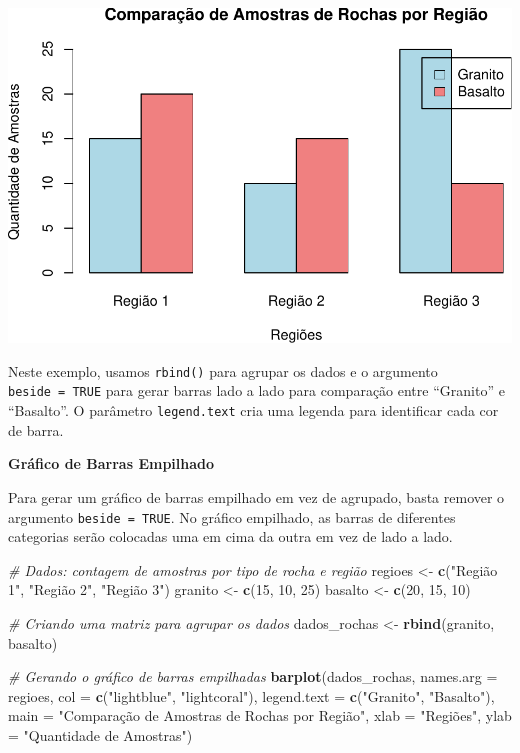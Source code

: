 \documentclass[
]{book}
\newenvironment{Shaded}{\begin{snugshade}}{\end{snugshade}}
\newcommand{\AttributeTok}[1]{\textcolor[rgb]{0.13,0.29,0.53}{#1}}
\newcommand{\CommentTok}[1]{\textcolor[rgb]{0.56,0.35,0.01}{\textit{#1}}}
\newcommand{\DecValTok}[1]{\textcolor[rgb]{0.00,0.00,0.81}{#1}}
\newcommand{\FunctionTok}[1]{\textcolor[rgb]{0.13,0.29,0.53}{\textbf{#1}}}
\newcommand{\NormalTok}[1]{#1}
\newcommand{\OtherTok}[1]{\textcolor[rgb]{0.56,0.35,0.01}{#1}}
\newcommand{\StringTok}[1]{\textcolor[rgb]{0.31,0.60,0.02}{#1}}
\begin{document}
\includegraphics{introR_files/figure-latex/unnamed-chunk-164-1.pdf}

Neste exemplo, usamos \texttt{rbind()} para agrupar os dados e o argumento \texttt{beside\ =\ TRUE} para gerar barras lado a lado para comparação entre ``Granito'' e ``Basalto''. O parâmetro \texttt{legend.text} cria uma legenda para identificar cada cor de barra.

\textbf{Gráfico de Barras Empilhado}

Para gerar um gráfico de barras empilhado em vez de agrupado, basta remover o argumento \texttt{beside\ =\ TRUE}. No gráfico empilhado, as barras de diferentes categorias serão colocadas uma em cima da outra em vez de lado a lado.

\begin{Shaded}
\begin{Highlighting}[]
\CommentTok{\# Dados: contagem de amostras por tipo de rocha e região}
\NormalTok{regioes }\OtherTok{\textless{}{-}} \FunctionTok{c}\NormalTok{(}\StringTok{"Região 1"}\NormalTok{, }\StringTok{"Região 2"}\NormalTok{, }\StringTok{"Região 3"}\NormalTok{)}
\NormalTok{granito }\OtherTok{\textless{}{-}} \FunctionTok{c}\NormalTok{(}\DecValTok{15}\NormalTok{, }\DecValTok{10}\NormalTok{, }\DecValTok{25}\NormalTok{)}
\NormalTok{basalto }\OtherTok{\textless{}{-}} \FunctionTok{c}\NormalTok{(}\DecValTok{20}\NormalTok{, }\DecValTok{15}\NormalTok{, }\DecValTok{10}\NormalTok{)}

\CommentTok{\# Criando uma matriz para agrupar os dados}
\NormalTok{dados\_rochas }\OtherTok{\textless{}{-}} \FunctionTok{rbind}\NormalTok{(granito, basalto)}

\CommentTok{\# Gerando o gráfico de barras empilhadas}
\FunctionTok{barplot}\NormalTok{(dados\_rochas, }
        \AttributeTok{names.arg =}\NormalTok{ regioes, }
        \AttributeTok{col =} \FunctionTok{c}\NormalTok{(}\StringTok{"lightblue"}\NormalTok{, }\StringTok{"lightcoral"}\NormalTok{), }
        \AttributeTok{legend.text =} \FunctionTok{c}\NormalTok{(}\StringTok{"Granito"}\NormalTok{, }\StringTok{"Basalto"}\NormalTok{),}
        \AttributeTok{main =} \StringTok{"Comparação de Amostras de Rochas por Região"}\NormalTok{, }
        \AttributeTok{xlab =} \StringTok{"Regiões"}\NormalTok{, }
        \AttributeTok{ylab =} \StringTok{"Quantidade de Amostras"}\NormalTok{)}
\end{Highlighting}
\end{Shaded}
\end{document}
